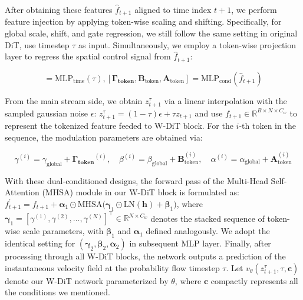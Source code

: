 After obtaining these features $\hat{f}_{t+1}$ aligned to time index $t+1$, we perform feature injection by applying token-wise scaling and shifting. Specifically, for global scale, shift, and gate regression, we still follow the same setting in original DiT, use timestep $\tau$ as input. Simultaneously, we employ a token-wise projection layer to regress the spatial control signal from $\hat{f}_{t+1}$:

\begin{equation*}
    [\gamma_{\text{global}}, \beta_{\text{global}}, \alpha_{\text{global}}] = \text{MLP}_{\text{time}}(\tau),  [\mathbf{\Gamma_{\text{token}}}, \mathbf{B}_{\text{token}}, \mathbf{A}_{\text{token}}] = \text{MLP}_{\text{cond}}(\hat{f}_{t+1})
\label{eq:dual_adaln_params}
\end{equation*}

From the main stream side, we obtain $z_{t+1}^{\tau}$ via a linear interpolation with the sampled gaussian noise $\epsilon$: $z_{t+1}^{\tau} = (1-\tau)\epsilon + \tau z_{t+1}$ and use $f_{t+1} \in \mathbb{R}^{B \times N \times C_w}$ to represent the tokenized feature feeded to W-DiT block. For the $i$-th token in the sequence, the modulation parameters are obtained via:

\begin{equation*}
\gamma^{(i)} = \gamma_{\text{global}} + \mathbf{\Gamma_{\text{token}}}^{(i)}, \quad \beta^{(i)} = \beta_{\text{global}} + \mathbf{B}_{\text{token}}^{(i)}, \quad \alpha^{(i)} = \alpha_{\text{global}} + \mathbf{A}_{\text{token}}^{(i)} 
\end{equation*}

With these dual-conditioned designs, the forward pass of the Multi-Head Self-Attention (MHSA) module in our W-DiT block is formulated as: $f_{t+1}^{\prime} = f_{t+1} + \boldsymbol{\alpha}_1 \odot \text{MHSA} \big( \boldsymbol{\gamma}_1 \odot \text{LN}(\mathbf{h}) + \boldsymbol{\beta}_1 \big)$, where $\boldsymbol{\gamma}_1 = [\gamma^{(1)}, \gamma^{(2)}, \dots, \gamma^{(N)}]^{\top} \in \mathbb{R}^{N \times C_w}$ denotes the stacked sequence of token-wise scale parameters, with $\boldsymbol{\beta}_1$ and $\boldsymbol{\alpha}_1$ defined analogously. We adopt the identical setting for $(\boldsymbol{\gamma}_2, \boldsymbol{\beta}_2, \boldsymbol{\alpha}_2)$ in subsequent MLP layer. Finally, after processing through all W-DiT blocks, the network outputs a prediction of the instantaneous velocity field at the probability flow timestep $\tau$. Let $v_\theta(z_{t+1}^{\tau}, \tau, \mathbf{c})$ denote our W-DiT network parameterized by $\theta$, where $\mathbf{c}$ compactly represents all the conditions we mentioned.

